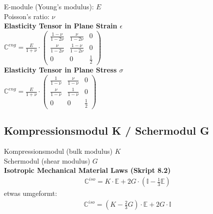 	E-module (Young's modulus): $E$\\
	Poisson's ratio: $\nu$\\
	
	\textbf{Elasticity Tensor in Plane Strain $\epsilon$}\\
	$\mathbb{C}^{eng} = \frac{E}{1 + \nu} \cdot \begin{pmatrix}
	\frac{1-\nu}{1-2\nu} & \frac{\nu}{1-2\nu} & 0\\
	\frac{\nu}{1-2\nu} & \frac{1-\nu}{1-2\nu} & 0\\
	0 & 0 & \frac{1}{2}
	\end{pmatrix}$\\
	
	\textbf{Elasticity Tensor in Plane Stress $\sigma$}\\
	$\mathbb{C}^{eng} = \frac{E}{1 + \nu} \cdot \begin{pmatrix}
	\frac{1}{1-\nu} & \frac{\nu}{1-\nu} & 0\\
	\frac{\nu}{1-\nu} & \frac{1}{1-\nu} & 0\\
	0 & 0 & \frac{1}{2}
	\end{pmatrix}$\\
	
	\subsection{Kompressionsmodul K / Schermodul G}
	
	Kompressionsmodul (bulk modulus) $K$\\
	
	Schermodul (shear modulus) $G$\\
	
	\textbf{Isotropic Mechanical Material Laws (Skript 8.2)}\\
	
	
	\begin{align}\label{eq:materiallaw}
		\mathbb{C}^{iso} = K \cdot \mathbb{E} + 2G \cdot (\mathbb{I} - \frac{1}{3}
		\mathbb{E})
	\end{align}
	etwas umgeformt:
	\begin{align}
		\mathbb{C}^{iso} = (K - \frac{2}{3} G) \cdot \mathbb{E} + 2G \cdot \mathbb{I}
	\end{align}
	
